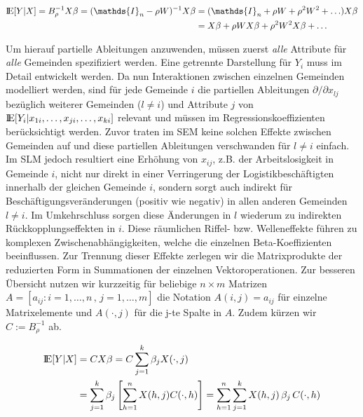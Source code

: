 \begin{alignat*}{1}
    \bbbe[Y|X]=B_{\rho}^{-1} X \beta = (\mathds{I}_{n} - \rho W)^{-1} X \beta & = 
    (\mathds{I}_{n} + \rho W + \rho^{2} W^{2} + \ldots) X \beta \\ & =
    X \beta + \rho W X \beta + \rho^{2} W^{2} X \beta + \ldots
\end{alignat*}

Um hierauf partielle Ableitungen anzuwenden, müssen zuerst \emph{alle} Attribute für \emph{alle} Gemeinden 
spezifiziert werden. Eine getrennte Darstellung für $Y_{i}$ muss im Detail entwickelt werden.
Da nun Interaktionen zwischen einzelnen Gemeinden modelliert werden, sind für jede Gemeinde $i$ 
die partiellen Ableitungen ${\partial} \big/ {\partial x_{lj}}$ bezüglich weiterer Gemeinden ($l \neq i$) und Attribute $j$ 
von ${\rm I\!E} [Y_{i}|x_{1i},\ldots,x_{ji},\ldots,x_{ki}] $ relevant und müssen im Regressionskoeffizienten berücksichtigt werden. 
Zuvor traten im SEM keine solchen Effekte zwischen Gemeinden auf und diese partiellen Ableitungen verschwanden für $l \neq i$ einfach.
Im SLM jedoch resultiert eine Erhöhung von $x_{ij}$, z.B. der Arbeitslosigkeit in Gemeinde $i$, nicht nur direkt in einer Verringerung 
der Logistikbeschäftigten innerhalb der gleichen Gemeinde $i$, sondern sorgt auch indirekt für Beschäftigungsveränderungen (positiv wie negativ) 
in allen anderen Gemeinden $l \neq i$. Im Umkehrschluss sorgen diese Änderungen in $l$ wiederum zu indirekten Rückkopplungseffekten in $i$. 
Diese räumlichen Riffel- bzw. Welleneffekte führen zu komplexen Zwischenabhängigkeiten, welche die einzelnen Beta-Koeffizienten beeinflussen.
Zur Trennung dieser Effekte zerlegen wir die Matrixprodukte der reduzierten Form in Summationen der einzelnen Vektoroperationen. 
Zur besseren Übersicht nutzen wir kurzzeitig für beliebige $n \times m$ Matrizen 
$A=[a_{ij}:i=1,\ldots,n \, , \, j=1,\ldots,m]$ die Notation $A(i,j)=a_{ij}$ für einzelne Matrixelemente 
und $A(\cdot,j)$ für die j-te Spalte in $A$. Zudem kürzen wir $C := B_{\rho}^{-1}$ ab.

\begin{alignat*}{1}
    {\rm I\!E}[Y|X] & = C X \beta = C \sum_{j=1}^{k} \beta_{j} X(\cdot,j) \\
    & = \sum_{j=1}^{k} \beta_{j} \left[ \sum_{h=1}^{n} X(h,j) C(\cdot,h) \right] 
    = \sum_{h=1}^{n} \sum_{j=1}^{k}  X(h,j) \, \beta_{j} \, C(\cdot,h)
\end{alignat*}


